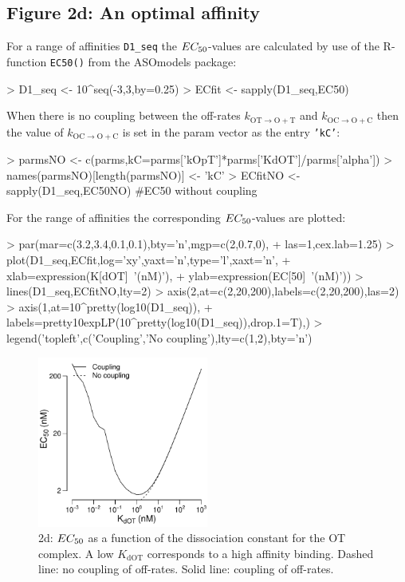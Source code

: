 \documentclass{article}
\newenvironment{Ncenter}{%
  \setlength\topsep{-10pt}
  \setlength\parskip{-100pt}
  \begin{center}
}{%
  \end{center}
}
\newcommand{\kmo}{k_{\mathrm{OT \to O+T}}}
\newcommand{\kD}{k_{\mathrm{OC \to O+C}}}
\newcommand{\EC}{EC_{\rm{50}}}
\newcommand{\KdOT}{K_{\mathrm{dOT}}}
\begin{document}
\subsection*{Figure 2d: An optimal affinity}
For a range of affinities \texttt{D1\_seq} the $\EC$-values are calculated by use of the R-function \texttt{EC50()} from the ASOmodels package:
\begin{Schunk}
\begin{Sinput}
> D1_seq <- 10^seq(-3,3,by=0.25)
> ECfit <- sapply(D1_seq,EC50)
\end{Sinput}
\end{Schunk}
When there is no coupling between the off-rates $\kmo$ and $\kD$ then the value of $\kD$ is set in the param vector as the entry \texttt{'kC'}:
\begin{Schunk}
\begin{Sinput}
> parmsNO <- c(parms,kC=parms['kOpT']*parms['KdOT']/parms['alpha'])
> names(parmsNO)[length(parmsNO)] <- 'kC'
> ECfitNO <- sapply(D1_seq,EC50NO) #EC50 without coupling
\end{Sinput}
\end{Schunk}
For the range of affinities the corresponding $\EC$-values are plotted:
\begin{Schunk}
\begin{Sinput}
> par(mar=c(3.2,3.4,0.1,0.1),bty='n',mgp=c(2,0.7,0),
+     las=1,cex.lab=1.25)
> plot(D1_seq,ECfit,log='xy',yaxt='n',type='l',xaxt='n',
+      xlab=expression(K[dOT]~'(nM)'),
+      ylab=expression(EC[50]~'(nM)'))
> lines(D1_seq,ECfitNO,lty=2)
> axis(2,at=c(2,20,200),labels=c(2,20,200),las=2)
> axis(1,at=10^pretty(log10(D1_seq)),
+      labels=pretty10expLP(10^pretty(log10(D1_seq)),drop.1=T),)
> legend('topleft',c('Coupling','No coupling'),lty=c(1,2),bty='n')
\end{Sinput}
\end{Schunk}
\begin{figure}[!h]
\begin{Ncenter}
\includegraphics[width=0.5\textwidth]{Vignette2-Figd}
\end{Ncenter}
\caption{2d: $\EC$ as a function of the dissociation constant for the OT complex. A low $\KdOT$ corresponds to a high affinity binding. Dashed line: no coupling of off-rates. Solid line: coupling of off-rates.}
\end{figure}
\end{document}
